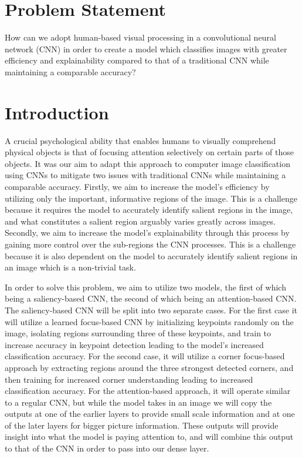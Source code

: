 \section{Problem Statement}
How can we adopt human-based visual processing in a convolutional neural network (CNN) in order to create a model which classifies images with greater efficiency and explainability compared to that of a traditional CNN while maintaining a comparable accuracy? 

\section{Introduction}
A crucial psychological ability that enables humans to visually comprehend physical objects is that of focusing attention selectively on certain parts of those objects. It was our aim to adapt this approach to computer image classification using CNNs to mitigate two issues with traditional CNNs while maintaining a comparable accuracy. Firstly, we aim to increase the model's efficiency by utilizing only the important, informative regions of the image. This is a challenge because it requires the model to accurately identify salient regions in the image, and what constitutes a salient region arguably varies greatly across images. Secondly, we aim to increase the model's explainability through this process by gaining more control over the sub-regions the CNN processes. This is a challenge because it is also dependent on the model to accurately identify salient regions in an image which is a non-trivial task. 

In order to solve this problem, we aim to utilize two models, the first of which being a saliency-based CNN, the second of which being an attention-based CNN. The saliency-based CNN will be split into two separate cases. For the first case it will utilize a learned focus-based CNN by initializing keypoints randomly on the image, isolating regions surrounding three of these keypoints, and train to increase accuracy in keypoint detection leading to the model's increased classification accuracy. For the second case, it will utilize a corner focus-based approach by extracting regions around the three strongest detected corners, and then training for increased corner understanding leading to increased classification accuracy. For the attention-based approach, it will operate similar to a regular CNN, but while the model takes in an image we will copy the outputs at one of the earlier layers to provide small scale information and at one of the later layers for bigger picture information. These outputs will provide insight into what the model is paying attention to, and will combine this output to that of the CNN in order to pass into our dense layer. 

